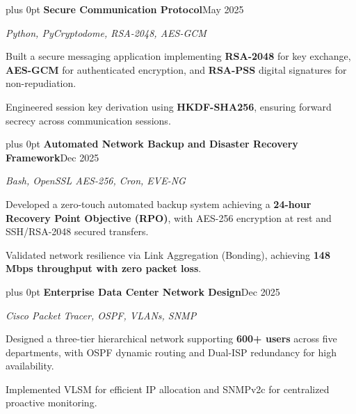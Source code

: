 \documentclass[10pt,letterpaper]{article}
\newcommand{\headerrow}[2]{%
  \begingroup\rightskip=0pt plus 0pt\relax
  #1\hfill #2\par\endgroup}
\newcommand{\project}[3]{%
  \headerrow{\textbf{#1}}{#2}%
  \textit{#3}\par\vspace{0.08em}}
\newenvironment{block}{\vspace{0.03em}\begingroup}{\endgroup\vspace{0.06em}}
\begin{document}
\begin{block}
\project{Secure Communication Protocol}{May 2025}
        {Python, PyCryptodome, RSA-2048, AES-GCM}
\begin{tight}
  \item Built a secure messaging application implementing \textbf{RSA-2048} for key exchange, \textbf{AES-GCM} for authenticated encryption, and \textbf{RSA-PSS} digital signatures for non-repudiation.
  \item Engineered session key derivation using \textbf{HKDF-SHA256}, ensuring forward secrecy across communication sessions.
\end{tight}
\vspace{0.18em}

\project{Automated Network Backup and Disaster Recovery Framework}{Dec 2025}
        {Bash, OpenSSL AES-256, Cron, EVE-NG}
\begin{tight}
  \item Developed a zero-touch automated backup system achieving a \textbf{24-hour Recovery Point Objective (RPO)}, with AES-256 encryption at rest and SSH/RSA-2048 secured transfers.
  \item Validated network resilience via Link Aggregation (Bonding), achieving \textbf{148 Mbps throughput with zero packet loss}.
\end{tight}
\vspace{0.18em}

\project{Enterprise Data Center Network Design}{Dec 2025}
        {Cisco Packet Tracer, OSPF, VLANs, SNMP}
\begin{tight}
  \item Designed a three-tier hierarchical network supporting \textbf{600+ users} across five departments, with OSPF dynamic routing and Dual-ISP redundancy for high availability.
  \item Implemented VLSM for efficient IP allocation and SNMPv2c for centralized proactive monitoring.
\end{tight}
\end{block}

\end{document}
